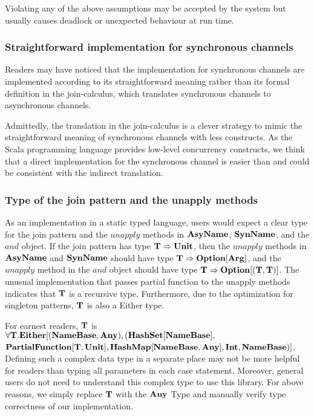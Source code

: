 Violating any of the above assumptions may be accepted by the system but usually causes deadlock or unexpected behaviour at run time.

\subsubsection{Straightforward implementation for synchronous channels}
Readers may have noticed that the implementation for synchronous channels are implemented according to its straightforward meaning rather than its formal definition in the join-calculus, which translates synchronous channels to asynchronous channels.

Admittedly, the translation in the join-calculus is a clever strategy to mimic the straightforward meaning of synchronous channels with less constructs.  As the Scala programming language provides low-level concurrency constructs, we think that a direct implementation for the synchronous channel is easier than and could be consistent with the indirect translation.

\subsubsection{Type of the join pattern and the unapply methods}
As an implementation in a static typed language, users would expect a clear type for the join pattern and the $unapply$ methods in $\bf{AsyName}$, $\bf{SynName}$, and the $and$ object.  If the join pattern has type $\bf{T} \Rightarrow \bf{Unit}$, then the $unapply$ methods in $\bf{AsyName}$ and $\bf{SynName}$ should have type $\bf{T} \Rightarrow \bf{Option[Arg]}$, and the $unapply$ method in the $and$ object should have type $\bf{T \Rightarrow Option[(T, T)]}$.  The unusual implementation that passes partial function to the unapply methods indicates that $\bf{T}$ is a recursive type.  Furthermore, due to the optimization for singleton patterns, $\bf{T}$ is also a Either type.  

For earnest readers, $\bf{T}$ is $\forall \bf{T.Either[(NameBase, Any), (HashSet[NameBase],  }$\\
$\bf{PartialFunction[T, Unit], HashMap[NameBase, Any], Int, NameBase)]}$.  Defining such a complex data type in a separate place may not be more helpful for readers than typing all parameters in each case statement.  Moreover, general users do not need to understand this complex type to use this library.  For above reasons, we simply replace $\bf{T}$ with the $\bf{Any}$ Type and manually verify type correctness of our implementation.

